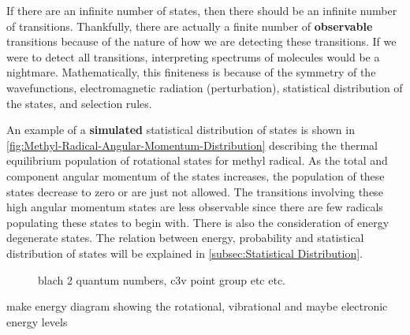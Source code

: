\documentclass[11pt,a4paper]{book}
\newcommand{\imginput}[1]{} %
\begin{document}
	If there are an infinite number of states, then there should be an infinite number of transitions. Thankfully, there are actually a finite number of \textbf{observable} transitions because of the nature of how we are detecting these transitions. If we were to detect all transitions, interpreting spectrums of molecules would be a nightmare. Mathematically, this finiteness is because of the symmetry of the wavefunctions, electromagnetic radiation (perturbation), statistical distribution of the states, and selection rules. 
	
	An example of a \textbf{simulated} statistical distribution of states is shown in \autoref{fig:Methyl-Radical-Angular-Momentum-Distribution} describing the thermal equilibrium population of rotational states for methyl radical. As the total and component angular momentum of the states increases, the population of these states decrease to zero or are just not allowed. The transitions involving these high angular momentum states are less observable since there are few radicals populating these states to begin with. There is also the consideration of energy degenerate states. The relation between energy, probability and statistical distribution of states will be explained in \autoref{subsec:Statistical Distribution}. 
	
	\begin{figure} [!ht]
		\centering
		\Large
		\def\svgwidth{\columnwidth}
		\resizebox{14cm}{!}{\imginput{images/Methyl-Radical-Angular-Momentum-Distribution.pdf_tex}}
		\caption{blach 2 quantum numbers, c3v point group etc etc.}
		\label{fig:Methyl-Radical-Angular-Momentum-Distribution}
	\end{figure}
	
	\noindent

	
	make energy diagram showing the rotational, vibrational and maybe electronic energy levels
\end{document}
